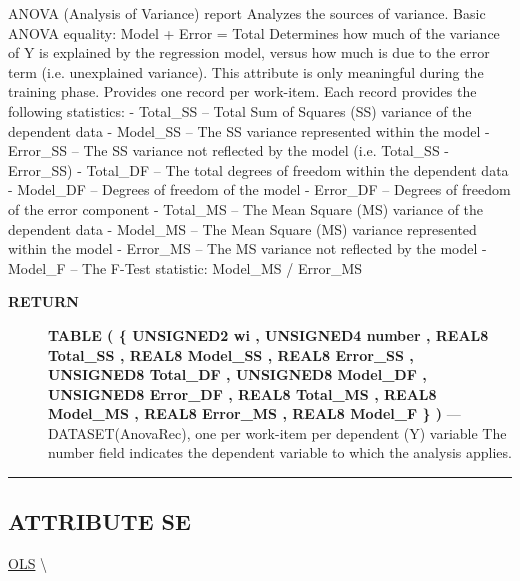 \par





ANOVA (Analysis of Variance) report Analyzes the sources of variance. Basic ANOVA equality: Model + Error = Total Determines how much of the variance of Y is explained by the regression model, versus how much is due to the error term (i.e. unexplained variance). This attribute is only meaningful during the training phase. Provides one record per work-item. Each record provides the following statistics: - Total\_SS -- Total Sum of Squares (SS) variance of the dependent data - Model\_SS -- The SS variance represented within the model - Error\_SS -- The SS variance not reflected by the model (i.e. Total\_SS - Error\_SS) - Total\_DF -- The total degrees of freedom within the dependent data - Model\_DF -- Degrees of freedom of the model - Error\_DF -- Degrees of freedom of the error component - Total\_MS -- The Mean Square (MS) variance of the dependent data - Model\_MS -- The Mean Square (MS) variance represented within the model - Error\_MS -- The MS variance not reflected by the model - Model\_F -- The F-Test statistic: Model\_MS / Error\_MS








\par
\begin{description}
\item [\colorbox{tagtype}{\color{white} \textbf{\textsf{RETURN}}}] \textbf{TABLE ( \{ UNSIGNED2 wi , UNSIGNED4 number , REAL8 Total\_SS , REAL8 Model\_SS , REAL8 Error\_SS , UNSIGNED8 Total\_DF , UNSIGNED8 Model\_DF , UNSIGNED8 Error\_DF , REAL8 Total\_MS , REAL8 Model\_MS , REAL8 Error\_MS , REAL8 Model\_F \} )} --- DATASET(AnovaRec), one per work-item per dependent (Y) variable The number field indicates the dependent variable to which the analysis applies.
\end{description}




\rule{\linewidth}{0.5pt}
\subsection*{\textsf{\colorbox{headtoc}{\color{white} ATTRIBUTE}
SE}}

\hypertarget{ecldoc:linearregression.ols.se}{}
\hspace{0pt} \hyperlink{ecldoc:linearregression.ols}{OLS} \textbackslash 

